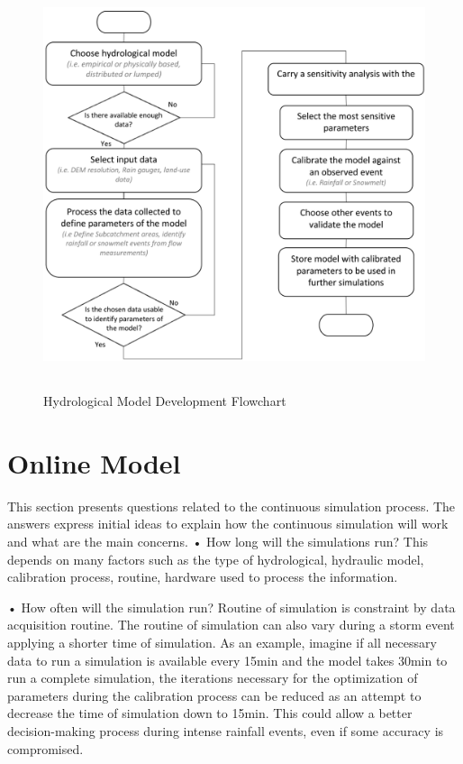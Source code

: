\begin{figure}[h]
    \centering
	\includegraphics[height=12cm]{figures/Offline_Model_Creation_Flow_Chart.png}
	\caption{Hydrological Model Development Flowchart}
	\label{fig:offlineflow}
\end{figure}



\section{Online Model}

This section presents questions related to the continuous simulation process. The answers express initial ideas to explain how the continuous simulation will work and what are the main concerns. 
•	How long will the simulations run? This depends on many factors such as the type of hydrological, hydraulic model, calibration process, routine, hardware used to process the information. 

•	How often will the simulation run? Routine of simulation is constraint by data acquisition routine.  The routine of simulation can also vary during a storm event applying a shorter time of simulation. As an example, imagine if all necessary data to run a simulation is available every 15min and the model takes 30min to run a complete simulation, the iterations necessary for the optimization of parameters during the calibration process can be reduced as an attempt to decrease the time of simulation down to 15min. This could allow a better decision-making process during intense rainfall events, even if some accuracy is compromised.

